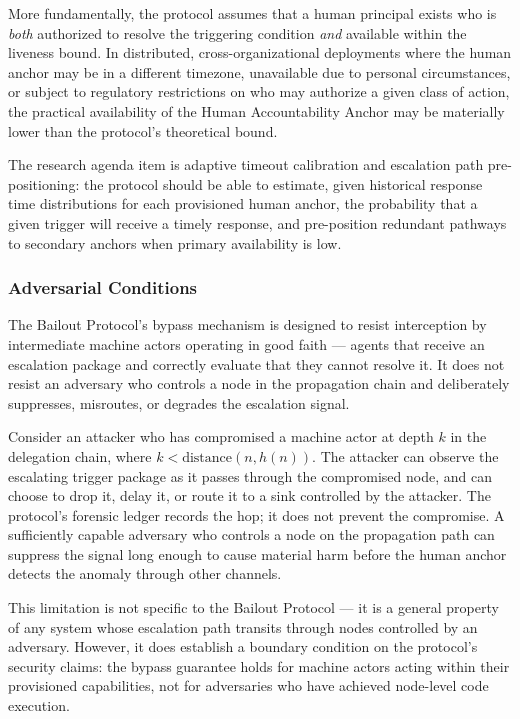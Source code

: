 More fundamentally, the protocol assumes that a human principal exists who is \emph{both} authorized to resolve the triggering condition \emph{and} available within the liveness bound. In distributed, cross-organizational deployments where the human anchor may be in a different timezone, unavailable due to personal circumstances, or subject to regulatory restrictions on who may authorize a given class of action, the practical availability of the Human Accountability Anchor may be materially lower than the protocol's theoretical bound.

The research agenda item is adaptive timeout calibration and escalation path pre-positioning: the protocol should be able to estimate, given historical response time distributions for each provisioned human anchor, the probability that a given trigger will receive a timely response, and pre-position redundant pathways to secondary anchors when primary availability is low.

\subsubsection{Adversarial Conditions}
\label{sec:limitations-adversarial}

The Bailout Protocol's bypass mechanism is designed to resist interception by intermediate machine actors operating in good faith — agents that receive an escalation package and correctly evaluate that they cannot resolve it. It does not resist an adversary who controls a node in the propagation chain and deliberately suppresses, misroutes, or degrades the escalation signal.

Consider an attacker who has compromised a machine actor at depth $k$ in the delegation chain, where $k < \text{distance}(n, h(n))$. The attacker can observe the escalating trigger package as it passes through the compromised node, and can choose to drop it, delay it, or route it to a sink controlled by the attacker. The protocol's forensic ledger records the hop; it does not prevent the compromise. A sufficiently capable adversary who controls a node on the propagation path can suppress the signal long enough to cause material harm before the human anchor detects the anomaly through other channels.

This limitation is not specific to the Bailout Protocol — it is a general property of any system whose escalation path transits through nodes controlled by an adversary. However, it does establish a boundary condition on the protocol's security claims: the bypass guarantee holds for machine actors acting within their provisioned capabilities, not for adversaries who have achieved node-level code execution.

